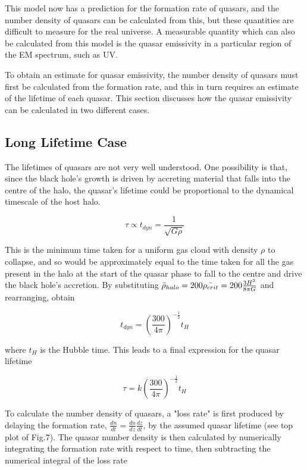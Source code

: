 \documentclass[12pt, twocolumn]{report}%
\begin{document}
This model now has a prediction for the formation rate of quasars, and the number density of quasars can be calculated from this, but these quantities are difficult to measure for the real universe. A measurable quantity which can also be calculated from this model is the quasar emissivity in a particular region of the EM spectrum, such as UV.\par

To obtain an estimate for quasar emissivity, the number density of quasars must first be calculated from the formation rate, and this in turn requires an estimate of the lifetime of each quasar. This section discusses how the quasar emissivity can be calculated in two different cases.

\subsection{Long Lifetime Case}

The lifetimes of quasars are not very well understood. One possibility is that, since the black hole’s growth is driven by accreting material that falls into the centre of the halo, the quasar’s lifetime could be proportional to the dynamical timescale of the host halo.

\begin{equation}
    \tau\propto t_{dyn}=\frac{1}{\sqrt{G\rho}}
\end{equation}

\noindent This is the minimum time taken for a uniform gas cloud with density $\rho$ to collapse, and so would be approximately equal to the time taken for all the gas present in the halo at the start of the quasar phase to fall to the centre and drive the black hole’s accretion. By substituting $\Bar{\rho}_{halo}=200\Bar{\rho_{crit}}=200\frac{3H^2}{8\pi G}$ and rearranging, obtain

\begin{equation}
    t_{dyn}=\left(\frac{300}{4\pi}\right)^{-\frac{1}{2}}t_H
\end{equation}

\noindent where $t_H$ is the Hubble time. This leads to a final expression for the quasar lifetime

\begin{equation}
    \tau=k\left(\frac{300}{4\pi}\right)^{-\frac{1}{2}}t_H
\end{equation}

To calculate the number density of quasars, a "loss rate" is first produced by delaying the formation rate, $\frac{dn}{dt}=\frac{dn}{dz}\frac{dz}{dt}$, by the assumed quasar lifetime (see top plot of Fig.7). The quasar number density is then calculated by numerically integrating the formation rate with respect to time, then subtracting the numerical integral of the loss rate
\end{document}
